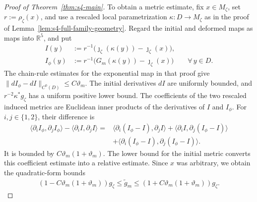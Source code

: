 \documentclass[a4paper,11pt,oneside,reqno]{amsart}
\numberwithin{equation}{section}
\theoremstyle{definition}
\begin{document}
\begin{proof}[Proof of Theorem~\ref{thm:s4-main}]
    To obtain a metric estimate, fix $x\in M_\zeta$, set
    $r:=\rho_\zeta(x)$, and use a rescaled local parametrization
    $\kappa:D\to M_\zeta$ as in the proof of
    Lemma~\ref{lem:s4-full-family-geometry}. Regard the
    initial and deformed maps as maps into $\mathbb R^5$,
    and put
    \begin{align*}
        I(y)&:=r^{-1}\bigl(\jmath_\zeta(\kappa(y))
                               -\jmath_\zeta(x)\bigr),\\
        I_\phi(y)&:=r^{-1}\bigl(G_m(\kappa(y))
                               -\jmath_\zeta(x)\bigr)
        \qquad\forall\,y\in D.
    \end{align*}
    The chain-rule estimates for the exponential map in that
    proof give $\|dI_\phi-dI\|_{C^0(D)}\leq C\vartheta_m$.
    The initial derivatives $dI$ are uniformly bounded, and
    $r^{-2}\kappa^*g_\zeta$ has a uniform positive lower
    bound. The coefficients of the two rescaled induced
    metrics are Euclidean inner products of the derivatives
    of $I$ and $I_\phi$. For $i,j\in\{1,2\}$, their
    difference is
    \begin{align*}
        \langle\partial_iI_\phi,\partial_jI_\phi\rangle
             -\langle\partial_iI,\partial_jI\rangle
        ={}&\langle\partial_i(I_\phi-I),\partial_jI\rangle
          +\langle\partial_iI,\partial_j(I_\phi-I)\rangle\\
          &+\langle\partial_i(I_\phi-I),
                     \partial_j(I_\phi-I)\rangle.
    \end{align*}
    It is bounded by $C\vartheta_m(1+\vartheta_m)$. The
    lower bound for the initial metric converts this
    coefficient estimate into a relative estimate. Since
    $x$ was arbitrary, we obtain the quadratic-form bounds
    \begin{align*}
        (1-C\vartheta_m(1+\vartheta_m))g_\zeta
        \leq\widetilde g_m
        \leq(1+C\vartheta_m(1+\vartheta_m))g_\zeta.
    \end{align*}


\end{proof}
\end{document}
